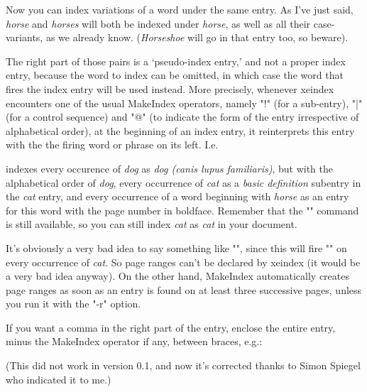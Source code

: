 \documentclass[%
]{codedoc}
\begin{document}
Now you can index variations of a word under the
same entry. As I've just said, \emph{horse} and \emph{horses}
will both be indexed under \emph{horse}, as well as
all their case-variants, as we already know.
(\emph{Horseshoe} will go in that entry too, so beware).

The right part of those pairs is a `pseudo-index entry,'
and not a proper index entry, because the word to index
can be omitted, in which case the word that fires the
index entry will be used instead. More precisely, whenever
xeindex encounters one of the usual MakeIndex operators,
namely "!" (for a sub-entry), "|" (for a control sequence)
and "@" (to indicate the form of the entry irrespective
of alphabetical order), at the beginning of an index entry,
it reinterprets this entry with the the firing
word or phrase on its left. I.e.

\begin{example}
\end{example}

\noindent
indexes every occurence of \emph{dog} as \emph{dog (canis lupus familiaris)},
but with the alphabetical order of \emph{dog},
every occurrence of \emph{cat} as a \emph{basic definition} subentry
in the \emph{cat} entry, and every occurrence of a word beginning with
\emph{horse} as an entry for this word with the page number in boldface.
Remember that the "\index" command is still available, so you can still
index \emph{cat} as \emph{cat} in your document.

It's obviously a very bad idea to say something like
"", since this will fire ""
on every occurrence of \emph{cat}. So page ranges can't be declared
by xeindex (it would be a very bad idea anyway). On the other
hand, MakeIndex automatically creates page ranges as soon as
an entry is found on at least three successive pages, unless you run it
with the "-r" option.

If you want a comma in the right part of the entry, enclose
the entire entry, minus the MakeIndex operator if any, between braces, e.g.:

\begin{example}
\end{example}

\noindent
(This did not work in version 0.1, and now it's corrected
thanks to Simon Spiegel who indicated it to me.)
\end{document}

